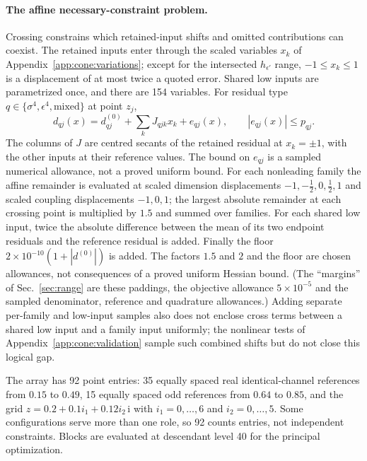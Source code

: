 \documentclass[11pt,a4paper]{article}
\numberwithin{equation}{section}
\newcommand{\sci}[2]{#1\times10^{#2}}
\begin{document}
\paragraph{The affine necessary-constraint problem.} Crossing constrains which retained-input shifts and omitted
contributions can coexist. The retained inputs enter through the scaled variables $x_k$ of
Appendix~\ref{app:cone:variations}; except for the intersected $h_{\epsilon'}$ range, $-1\le x_k\le1$ is a displacement of
at most twice a quoted error. Shared low inputs are parametrized once, and there are 154 variables. For residual type
$q\in\{\sigma^4,\epsilon^4,\text{mixed}\}$ at point $z_j$,
\begin{equation}
 d_{qj}(x)=d^{(0)}_{qj}+\sum_kJ_{qjk}x_k+e_{qj}(x),\qquad |e_{qj}(x)|\le p_{qj}.
 \label{eq:cone:affine}
\end{equation}
The columns of $J$ are centred secants of the retained residual at $x_k=\pm1$, with the other inputs at their
reference values. The bound on $e_{qj}$ is a sampled numerical allowance, not a proved uniform bound. For each
nonleading family the affine remainder is evaluated at scaled dimension displacements $-1,-\frac12,0,\frac12,1$ and
scaled coupling displacements $-1,0,1$; the largest absolute remainder at each crossing point is multiplied by $1.5$ and
summed over families. For each shared low input, twice the absolute difference between the mean of its two endpoint
residuals and the reference residual is added. Finally the floor $\sci{2}{-10}(1+|d^{(0)}|)$ is added. The factors
$1.5$ and $2$ and the floor are chosen allowances, not consequences of a proved uniform Hessian bound. (The ``margins''
of Sec.~\ref{sec:range} are these paddings, the objective allowance $\sci{5}{-5}$ and the sampled denominator, reference
and quadrature allowances.) Adding separate
per-family and low-input samples also does not enclose cross terms between a shared low input and a family input
uniformly; the nonlinear tests of Appendix~\ref{app:cone:validation} sample such combined shifts but do not close this
logical gap.

The array has 92 point entries: 35 equally spaced real identical-channel references from $0.15$ to $0.49$, 15 equally
spaced odd references from $0.64$ to $0.85$, and the grid $z=0.2+0.1i_1+0.12i_2\,\mathrm i$ with $i_1=0,\dots,6$ and
$i_2=0,\dots,5$. Some configurations serve more than one role, so 92 counts entries, not independent constraints.
Blocks are evaluated at descendant level 40 for the principal optimization.
\end{document}
